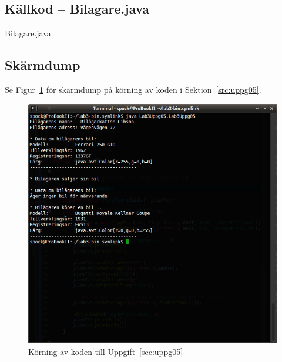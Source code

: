 \subsection{Källkod -- Bilagare.java}
\caption{Bilagare.java}
\label{src:bilagare}


\subsection{Skärmdump}
Se Figur~\ref{fig:uppg05-screenshot} för skärmdump på körning av koden i 
Sektion~\ref{src:uppg05}.

\begin{figure}[htbp]
    \centering
        \includegraphics[width=\linewidth]{img/05.png}
    \caption{Körning av koden till Uppgift~\ref{sec:uppg05}}
    \label{fig:uppg05-screenshot}
\end{figure}

